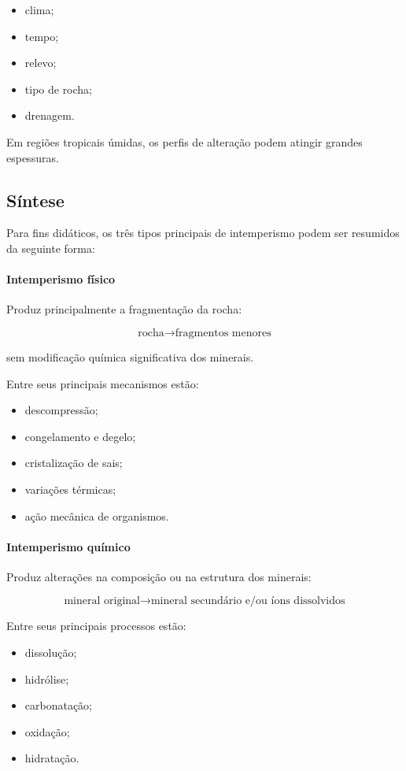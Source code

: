 \documentclass[a4paper,12pt]{article}
\theoremstyle{definition}
\theoremstyle{definition}
\theoremstyle{definition}
\begin{document}
\begin{itemize}
    \item clima;
    \item tempo;
    \item relevo;
    \item tipo de rocha;
    \item drenagem.
\end{itemize}

Em regiões tropicais úmidas, os perfis de alteração podem atingir grandes espessuras.

\subsection{Síntese}

Para fins didáticos, os três tipos principais de intemperismo podem ser resumidos da seguinte forma:

\paragraph{Intemperismo físico}

Produz principalmente a fragmentação da rocha:

\[
\text{rocha}
\rightarrow
\text{fragmentos menores}
\]

sem modificação química significativa dos minerais.

Entre seus principais mecanismos estão:

\begin{itemize}
    \item descompressão;
    \item congelamento e degelo;
    \item cristalização de sais;
    \item variações térmicas;
    \item ação mecânica de organismos.
\end{itemize}

\paragraph{Intemperismo químico}

Produz alterações na composição ou na estrutura dos minerais:

\[
\text{mineral original}
\rightarrow
\text{mineral secundário e/ou íons dissolvidos}
\]

Entre seus principais processos estão:

\begin{itemize}
    \item dissolução;
    \item hidrólise;
    \item carbonatação;
    \item oxidação;
    \item hidratação.
\end{itemize}
\end{document}
